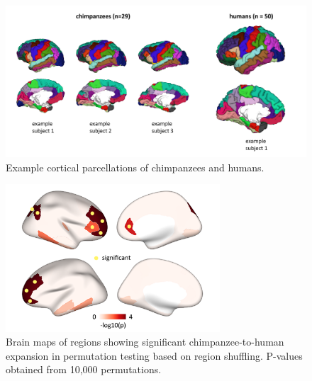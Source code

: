\begin{refsection}
\begin{figure}[H]
    \centering
    \includegraphics[width=\linewidth]{images/harFigS12.png}
    \caption{Example cortical parcellations of chimpanzees and humans.}
    \label{harFigs12}
\end{figure}

\begin{figure}[H]
    \centering
    \includegraphics[width=8cm]{images/harFigS13.png}
    \caption{Brain maps of regions showing significant chimpanzee-to-human expansion in permutation testing based on region shuffling. P-values obtained from 10,000 permutations.}
    \label{harFigs13}
\end{figure}


\end{refsection}
